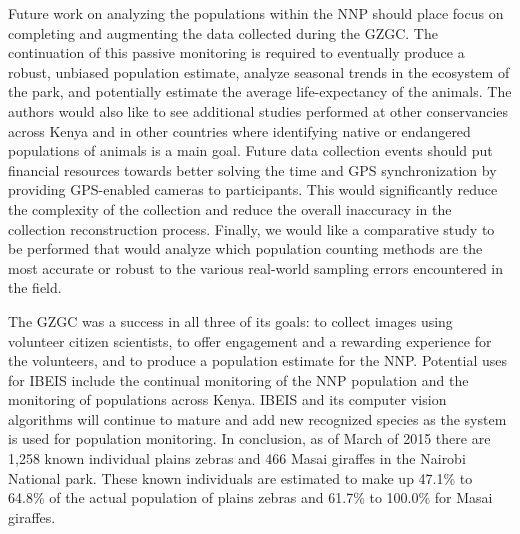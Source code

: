 Future work on analyzing the populations within the NNP should place focus on completing and augmenting the data collected during the GZGC.  The continuation of this passive monitoring is required to eventually produce a robust, unbiased population estimate, analyze seasonal trends in the ecosystem of the park, and potentially estimate the average life-expectancy of the animals.  The authors would also like to see additional studies performed at other conservancies across Kenya and in other countries where identifying native or endangered populations of animals is a main goal.  Future data collection events should put financial resources towards better solving the time and GPS synchronization by providing  GPS-enabled cameras to participants.  This would significantly reduce the complexity of the collection and reduce the overall inaccuracy in the collection reconstruction process.  Finally, we would like a comparative study to be performed that would analyze which population counting methods are the most accurate or robust to the various real-world sampling errors encountered in the field.

The GZGC was a success in all three of its goals: to collect images using volunteer citizen scientists, to offer engagement and a rewarding experience for the volunteers, and to produce a population estimate for the NNP.  Potential uses for IBEIS include the continual monitoring of the NNP population and the monitoring of populations across Kenya.  IBEIS and its computer vision algorithms will continue to mature and add new recognized species as the system is used for population monitoring.  In conclusion, as of March of 2015 there are 1,258 known individual plains zebras and 466 Masai giraffes in the Nairobi National park.  These known individuals are estimated to make up 47.1\% to 64.8\% of the actual population of plains zebras and 61.7\% to 100.0\% for Masai giraffes.
